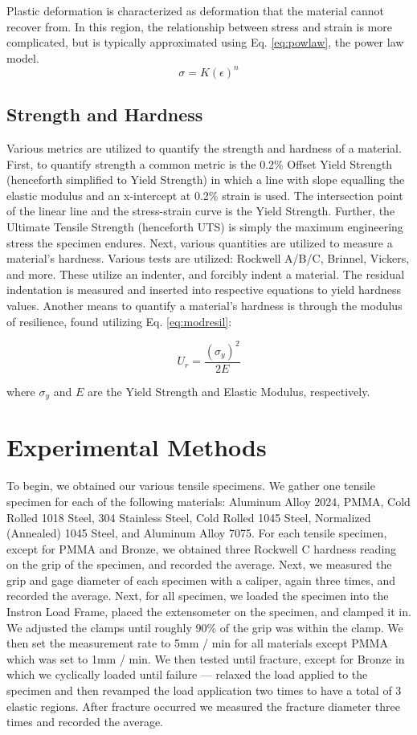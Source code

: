\documentclass{article}
\begin{document}
Plastic deformation is characterized as deformation that the material cannot recover from. In this region, the relationship between stress and strain is more complicated, but is typically approximated using Eq. \ref{eq:powlaw}, the power law model.
\begin{equation}
    \sigma = K \left( \epsilon\right)^n
    \label{eq:powlaw}
\end{equation}

\subsection{Strength and Hardness}
Various metrics are utilized to quantify the strength and hardness of a material. First, to quantify strength a common metric is the 0.2\% Offset Yield Strength (henceforth simplified to Yield Strength) in which a line with slope equalling the elastic modulus and an x-intercept at 0.2\% strain is used. The intersection point of the linear line and the stress-strain curve is the Yield Strength. Further, the Ultimate Tensile Strength (henceforth UTS) is simply the maximum engineering stress the specimen endures. Next, various quantities are utilized to measure a material's hardness. Various tests are utilized: Rockwell A/B/C, Brinnel, Vickers, and more. These utilize an indenter, and forcibly indent a material. The residual indentation is measured and inserted into respective equations to yield hardness values. Another means to quantify a material's hardness is through the modulus of resilience, found utilizing Eq. \ref{eq:modresil}:

\begin{equation}
    U_r = \frac{\left(\sigma_y\right)^2}{2E} 
    \label{eq:modresil}
\end{equation}

where $\sigma_y$ and $E$ are the Yield Strength and Elastic Modulus, respectively. 

\section{Experimental Methods}
To begin, we obtained our various tensile specimens. We gather one tensile specimen for each of the following materials: Aluminum Alloy 2024, PMMA, Cold Rolled 1018 Steel, 304 Stainless Steel, Cold Rolled 1045 Steel, Normalized (Annealed) 1045 Steel, and Aluminum Alloy 7075. For each tensile specimen, except for PMMA and Bronze, we obtained three Rockwell C hardness reading on the grip of the specimen, and recorded the average. Next, we measured the grip and gage diameter of each specimen with a caliper, again three times, and recorded the average. Next, for all specimen, we loaded the specimen into the Instron Load Frame, placed the extensometer on the specimen, and clamped it in. We adjusted the clamps until roughly 90\% of the grip was within the clamp.  We then set the measurement rate to 5mm / min for all materials except PMMA which was set to 1mm / min. We then tested until fracture, except for Bronze in which we cyclically loaded until failure --- relaxed the load applied to the specimen and then revamped the load application two times to have a total of 3 elastic regions. After fracture occurred we measured the fracture diameter three times and recorded the average.
\newpage
\end{document}
